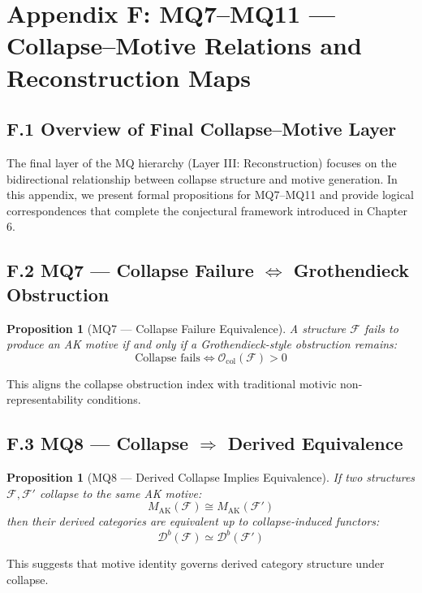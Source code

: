 \documentclass[11pt]{article}
\newtheorem{proposition}[theorem]{Proposition}
\begin{document}
\section*{Appendix F: MQ7–MQ11 — Collapse–Motive Relations and Reconstruction Maps}

\subsection*{F.1 Overview of Final Collapse–Motive Layer}

The final layer of the MQ hierarchy (Layer III: Reconstruction) focuses on the bidirectional relationship between collapse structure and motive generation. In this appendix, we present formal propositions for MQ7–MQ11 and provide logical correspondences that complete the conjectural framework introduced in Chapter 6.

\subsection*{F.2 MQ7 — Collapse Failure $\iff$ Grothendieck Obstruction}

\begin{proposition}[MQ7 — Collapse Failure Equivalence]
A structure $\mathcal{F}$ fails to produce an AK motive if and only if a Grothendieck-style obstruction remains:
\[
\text{Collapse fails} \iff \mathcal{O}_{\mathrm{col}}(\mathcal{F}) > 0
\]
\end{proposition}

This aligns the collapse obstruction index with traditional motivic non-representability conditions.

\subsection*{F.3 MQ8 — Collapse $\Rightarrow$ Derived Equivalence}

\begin{proposition}[MQ8 — Derived Collapse Implies Equivalence]
If two structures $\mathcal{F}, \mathcal{F}'$ collapse to the same AK motive:
\[
M_{\mathrm{AK}}(\mathcal{F}) \cong M_{\mathrm{AK}}(\mathcal{F}')
\]
then their derived categories are equivalent up to collapse-induced functors:
\[
\mathcal{D}^b(\mathcal{F}) \simeq \mathcal{D}^b(\mathcal{F}')
\]
\end{proposition}

This suggests that motive identity governs derived category structure under collapse.
\end{document}
